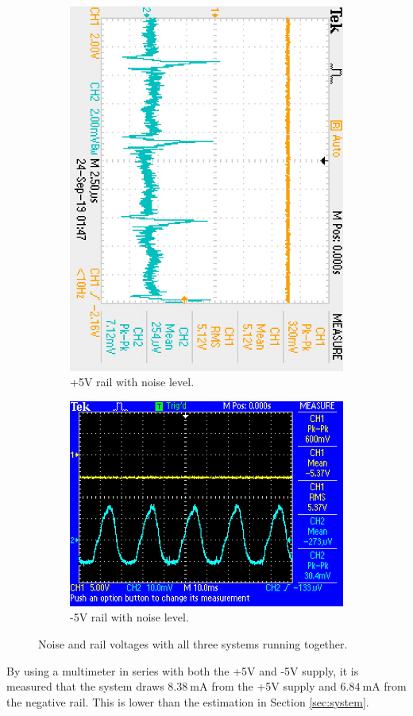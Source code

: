  \begin{figure}
 \centering
     \begin{subfigure}[]{0.35\textwidth}
        \centering
         \includegraphics[height=1\linewidth, angle=90]{./Figures/+5V}
		    \caption{+5V rail with noise level.} \label{subfig:+5v_rail}
     \end{subfigure}
      \begin{subfigure}[]{0.35\textwidth}
              \centering
  		\includegraphics[width=1\linewidth]{./Figures/-5V}
		    \caption{-5V rail with noise level.} \label{subfig:-5v_rail}
     \end{subfigure}
   \caption{Noise and rail voltages with all three systems running together.}
    \label{fig:rails}
 \end{figure}
 
 
By using a multimeter in series with both the +5V and -5V supply, it is measured that the system draws $\SI{8.38}{\milli\ampere}$ from the +5V supply and $\SI{6.84}{\milli\ampere}$ from the negative rail. This is lower than the estimation in Section \ref{sec:system}.








